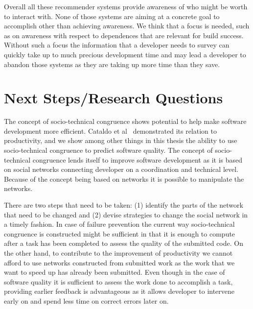Overall all these recommender systems provide awareness of who might be worth to interact with.
None of those systems are aiming at a concrete goal to accomplish other than achieving awareness.
We think that a focus is needed, such as on awareness with respect to dependences that are relevant for build success.
Without such a focus the information that a developer needs to survey can quickly take up to much precious development time and may lead a developer to abandon those systems as they are taking up more time than they save.






\section{Next Steps/Research Questions}
The concept of socio-technical congruence shows potential to help make software development more efficient.
Cataldo et al~\cite{cataldo:cscw:2006} demonstrated its relation to productivity, and we show among other things in this thesis the ability to use socio-technical congruence to predict software quality.
The concept of socio-technical congruence lends itself to improve software development as it is based on social networks connecting developer on a coordination and technical level.
Because of the concept being based on networks it is possible to manipulate the networks.

There are two steps that need to be taken:
(1) identify the parts of the network that need to be changed
and (2) devise strategies to change the social network in a timely fashion.
%
%
%
%
In case of failure prevention the current way socio-technical congruence is constructed might be sufficient in that it is enough to compute after a task has been completed to assess the quality of the submitted code.
On the other hand, to contribute to the improvement of productivity we cannot afford to use networks constructed from submitted work as the work that we want to speed up has already been submitted.
Even though in the case of software quality it is sufficient to assess the work done to accomplish a task, providing earlier feedback is advantageous as it allows developer to intervene early on and spend less time on correct errors later on.

